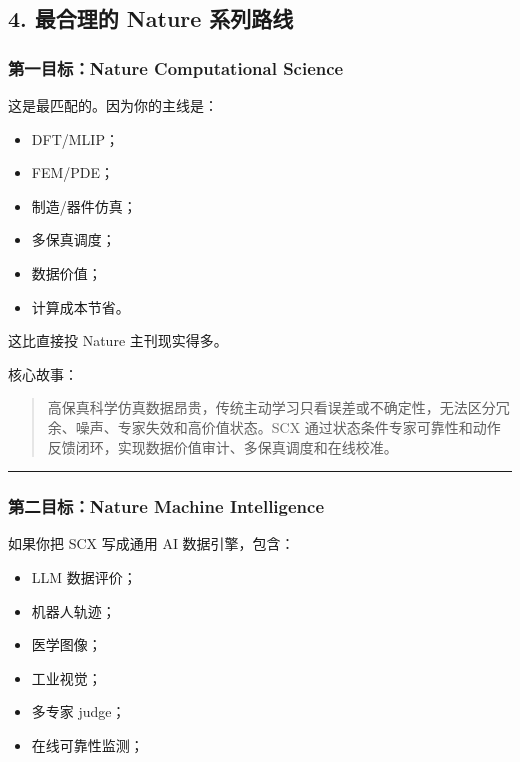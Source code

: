 \documentclass[
  12pt,
]{ctexart}
\providecommand{\tightlist}{%
  \setlength{\itemsep}{0pt}\setlength{\parskip}{0pt}}
\begin{document}
\subsection{4. 最合理的 Nature
系列路线}\label{ux6700ux5408ux7406ux7684-nature-ux7cfbux5217ux8defux7ebf}

\subsubsection{第一目标：Nature Computational
Science}\label{ux7b2cux4e00ux76eeux6807nature-computational-science}

这是最匹配的。因为你的主线是：

\begin{itemize}
\tightlist
\item
  DFT/MLIP；
\item
  FEM/PDE；
\item
  制造/器件仿真；
\item
  多保真调度；
\item
  数据价值；
\item
  计算成本节省。
\end{itemize}

这比直接投 Nature 主刊现实得多。

核心故事：

\begin{quote}
高保真科学仿真数据昂贵，传统主动学习只看误差或不确定性，无法区分冗余、噪声、专家失效和高价值状态。SCX
通过状态条件专家可靠性和动作反馈闭环，实现数据价值审计、多保真调度和在线校准。
\end{quote}

\begin{center}\rule{0.5\linewidth}{0.5pt}\end{center}

\subsubsection{第二目标：Nature Machine
Intelligence}\label{ux7b2cux4e8cux76eeux6807nature-machine-intelligence}

如果你把 SCX 写成通用 AI 数据引擎，包含：

\begin{itemize}
\tightlist
\item
  LLM 数据评价；
\item
  机器人轨迹；
\item
  医学图像；
\item
  工业视觉；
\item
  多专家 judge；
\item
  在线可靠性监测；
\end{itemize}
\end{document}
